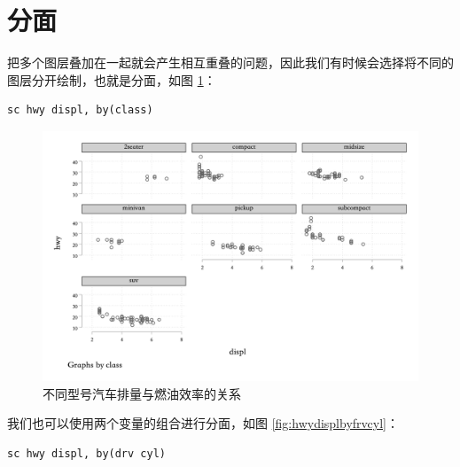\documentclass[]{ctexbook}
\begin{document}
\hypertarget{section-32}{%
\section{分面}\label{section-32}}

把多个图层叠加在一起就会产生相互重叠的问题，因此我们有时候会选择将不同的图层分开绘制，也就是分面，如图 \ref{fig:hwydisplbyclass}：

\begin{lstlisting}
sc hwy displ, by(class)
\end{lstlisting}

\begin{figure}

{\centering \includegraphics[width=1\textwidth]{assets/hwydisplbyclass} 

}

\caption{不同型号汽车排量与燃油效率的关系}\label{fig:hwydisplbyclass}
\end{figure}

我们也可以使用两个变量的组合进行分面，如图 \ref{fig:hwydisplbyfrvcyl}：

\begin{lstlisting}
sc hwy displ, by(drv cyl)
\end{lstlisting}
\end{document}
